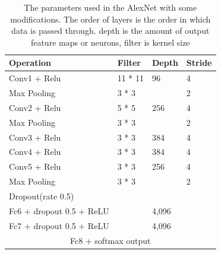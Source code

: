 \documentclass[12pt, a4paper,oneside]{report}
\begin{document}
\begin{table}[!htbp]
	\centering {} \small
	\label{table:para}
	\begin{adjustbox}{max width=1.1\textwidth,center}
		
		\begin{tabular}{|p{3cm}|p{3cm}|p{3cm}|p{3cm}|}
			\hline	
			Operation & Filter & Depth & Stride \\ \hline
			
			Conv1 + Relu  &  11 * 11  & 96  & 4 \\  \hline	 
			
			Max Pooling & 3 * 3  &  & 2 \\ \hline	   
			
			Conv2 + Relu & 5 * 5 & 256  & 4 \\ \hline	
			
			Max Pooling & 3 * 3 & & 2 \\ \hline
			
			Conv3 + Relu & 3 * 3 & 384 & 4 \\ \hline	
			
			Conv4 + Relu & 3 * 3  & 384  & 4 \\ \hline	
			
			Conv5 + Relu & 3 * 3  & 256 & 4 \\ \hline	
			
			Max Pooling & 3 * 3 & & 2 \\ \hline
			
			Dropout(rate 0.5) &  & & \\ \hline
			
			Fc6 + dropout 0.5 + ReLU & & 4,096 & \\ \hline
			
			Fc7 + dropout 0.5 + ReLU & &  4,096 & \\ \hline
			
			\multicolumn{4}{|c|}{
				Fc8  + softmax output} \\
			
			\hline
			
		\end{tabular}
		
	\end{adjustbox}
	\caption {The parameters used in the AlexNet with some modifications. The order of layers is the order in which
		data is passed through. depth is the amount of output feature maps or neurons, filter is kernel
		size}	
\end{table}
\end{document}
